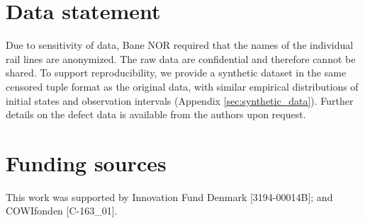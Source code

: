 \documentclass{article}
\begin{document}
\section*{Data statement}
Due to sensitivity of data, Bane NOR required that the names of the individual rail lines are anonymized. The raw data are confidential and therefore cannot be shared. To support reproducibility, we provide a synthetic dataset in the same censored tuple format as the original data, with similar empirical distributions of initial states and observation intervals (Appendix \ref{sec:synthetic_data}). Further details on the defect data is available from the authors upon request.


\section*{Funding sources}
This work was supported by Innovation Fund Denmark [3194-00014B]; and COWIfonden [C-163\_01].
\end{document}
